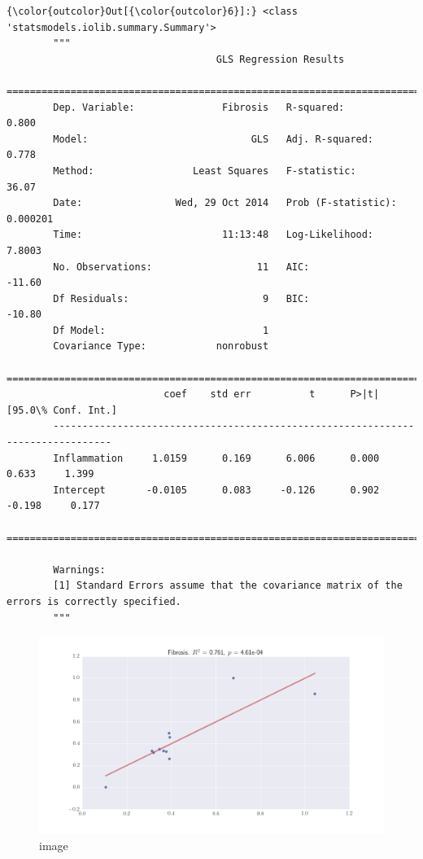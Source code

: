\documentclass{article}
\begin{document}
            \begin{Verbatim}[commandchars=\\\{\}]
{\color{outcolor}Out[{\color{outcolor}6}]:} <class 'statsmodels.iolib.summary.Summary'>
        """
                                    GLS Regression Results                            
        ==============================================================================
        Dep. Variable:               Fibrosis   R-squared:                       0.800
        Model:                            GLS   Adj. R-squared:                  0.778
        Method:                 Least Squares   F-statistic:                     36.07
        Date:                Wed, 29 Oct 2014   Prob (F-statistic):           0.000201
        Time:                        11:13:48   Log-Likelihood:                 7.8003
        No. Observations:                  11   AIC:                            -11.60
        Df Residuals:                       9   BIC:                            -10.80
        Df Model:                           1                                         
        Covariance Type:            nonrobust                                         
        ================================================================================
                           coef    std err          t      P>|t|      [95.0\% Conf. Int.]
        --------------------------------------------------------------------------------
        Inflammation     1.0159      0.169      6.006      0.000         0.633     1.399
        Intercept       -0.0105      0.083     -0.126      0.902        -0.198     0.177
        ================================================================================
        
        Warnings:
        [1] Standard Errors assume that the covariance matrix of the errors is correctly specified.
        """
\end{Verbatim}
        
    \begin{figure}[htbp]
\centering
\includegraphics{figures/fibrosis.png}
\caption{image}
\end{figure}
\end{document}
